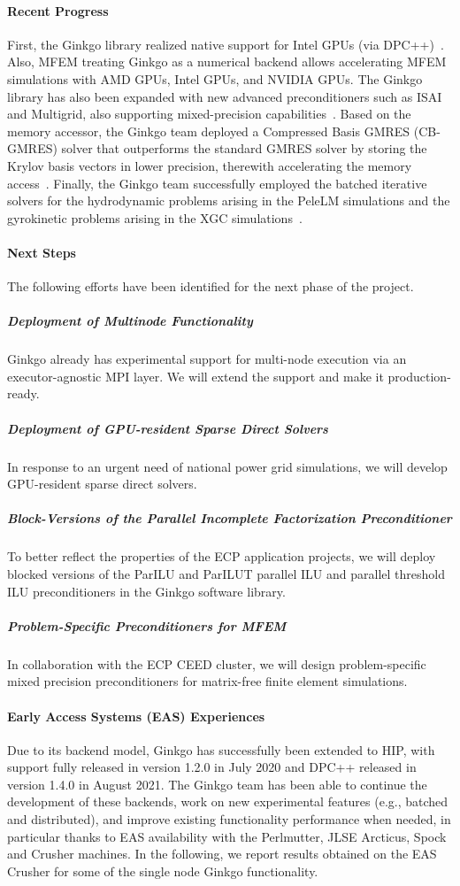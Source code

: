 \paragraph{Recent Progress}
%
First, the Ginkgo library realized native support for Intel GPUs (via
		DPC++)~\cite{tsai2021porting}.
Also, MFEM treating Ginkgo as a numerical backend allows accelerating MFEM
		simulations with AMD GPUs, Intel GPUs, and NVIDIA GPUs.
The Ginkgo library has also been expanded with new advanced preconditioners
		such as ISAI and Multigrid, also supporting mixed-precision capabilities~\cite{10.1007/978-3-030-85665-6_34}.
Based on the memory accessor, the Ginkgo team deployed a Compressed
		Basis GMRES (CB-GMRES) solver that outperforms the standard GMRES solver
		by storing the Krylov basis vectors in lower precision, therewith
		accelerating the memory access~\cite{DBLP:journals/corr/abs-2009-12101}.
Finally, the Ginkgo team successfully employed the batched iterative solvers for
		the hydrodynamic problems arising in the PeleLM
		simulations and the gyrokinetic problems arising in the
		XGC simulations~\cite{batched-scala2021}.


\paragraph{Next Steps}
The following efforts have been identified for the next phase of the project.

  \subparagraph{Deployment of Multinode Functionality} Ginkgo already has
		experimental support for multi-node execution via an executor-agnostic
		MPI layer. We will extend the support and make it production-ready.
  \subparagraph{Deployment of GPU-resident Sparse Direct Solvers} In response to
		an urgent need of national power grid simulations, we will develop
		GPU-resident sparse direct solvers.
  \subparagraph{Block-Versions of the Parallel Incomplete Factorization
		Preconditioner} To better reflect the properties of the ECP application
		projects, we will deploy blocked versions of the ParILU and ParILUT
		parallel ILU and parallel threshold ILU preconditioners in the Ginkgo
		software library.
  \subparagraph{Problem-Specific Preconditioners for MFEM} In collaboration
		with the ECP CEED cluster, we will design problem-specific mixed
		precision preconditioners for matrix-free finite element simulations.



\paragraph{Early Access Systems (EAS) Experiences}
Due to its backend model, Ginkgo has successfully been extended to HIP, with
support fully released in version 1.2.0 in July 2020 and DPC++ released in
version 1.4.0 in August 2021. The Ginkgo team has been able to continue the
development of these backends, work on new experimental features (e.g., batched
and distributed), and improve existing functionality performance when needed, in
particular thanks to EAS availability with the Perlmutter, JLSE Arcticus, Spock
and Crusher machines. In the following, we report results obtained on the EAS
Crusher for some of the single node Ginkgo functionality.

